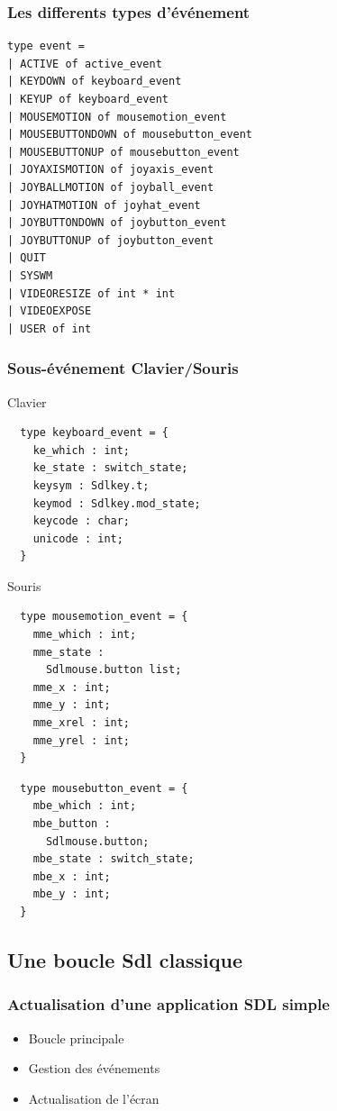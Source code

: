 \begin{frame}[fragile]
	\frametitle{Les differents types d'événement}
	\lstset{basicstyle=\small}
	\begin{lstlisting}
type event =
| ACTIVE of active_event
| KEYDOWN of keyboard_event
| KEYUP of keyboard_event
| MOUSEMOTION of mousemotion_event
| MOUSEBUTTONDOWN of mousebutton_event
| MOUSEBUTTONUP of mousebutton_event
| JOYAXISMOTION of joyaxis_event
| JOYBALLMOTION of joyball_event
| JOYHATMOTION of joyhat_event
| JOYBUTTONDOWN of joybutton_event
| JOYBUTTONUP of joybutton_event
| QUIT
| SYSWM
| VIDEORESIZE of int * int
| VIDEOEXPOSE
| USER of int
	\end{lstlisting}
\end{frame}

\begin{frame}[fragile]
	\frametitle{Sous-événement Clavier/Souris}
	\lstset{basicstyle=\scriptsize}
	\begin{block}{Clavier}
		\begin{lstlisting}
  type keyboard_event = {
    ke_which : int;
    ke_state : switch_state;
    keysym : Sdlkey.t;
    keymod : Sdlkey.mod_state;
    keycode : char;
    unicode : int;
  }
		\end{lstlisting}
	\end{block}
	\begin{block}{Souris}
		\begin{minipage}{0.47\textwidth}
			\begin{lstlisting}
  type mousemotion_event = {
    mme_which : int;
    mme_state : 
      Sdlmouse.button list;
    mme_x : int;
    mme_y : int;
    mme_xrel : int;
    mme_yrel : int;
  }
			\end{lstlisting}
		\end{minipage}
		\begin{minipage}{0.4\textwidth}
			\begin{lstlisting}
  type mousebutton_event = {
    mbe_which : int;
    mbe_button : 
      Sdlmouse.button;
    mbe_state : switch_state;
    mbe_x : int;
    mbe_y : int;
  }
			\end{lstlisting}
		\end{minipage}
	\end{block}
\end{frame}

\subsection{Une boucle Sdl classique} %
\begin{frame}[fragile]
	\frametitle{Actualisation d'une application SDL simple}
	\large
	\begin{itemize}
		\item Boucle principale
		\item Gestion des événements
		\item Actualisation de l'écran
	\end{itemize}
\end{frame}

